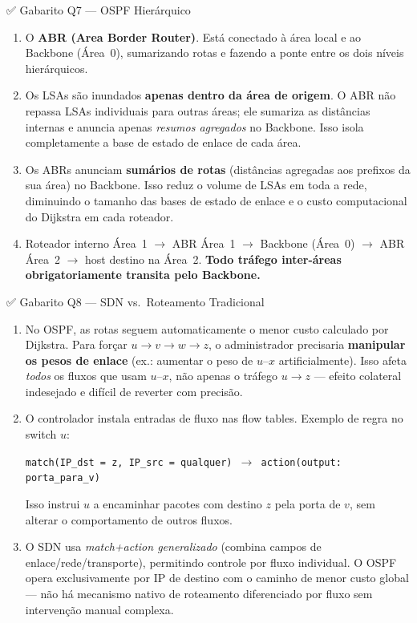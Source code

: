 \documentclass[11pt,a4paper]{article}
\begin{document}
\begin{gabaritocaixa}{✅ Gabarito Q7 --- OSPF Hierárquico}
\begin{enumerate}[label=(\alph*)]
    \item O \textbf{ABR (Area Border Router)}. Está conectado à área local e ao Backbone (Área~0), sumarizando rotas e fazendo a ponte entre os dois níveis hierárquicos.
    \item Os LSAs são inundados \textbf{apenas dentro da área de origem}. O ABR não repassa LSAs individuais para outras áreas; ele sumariza as distâncias internas e anuncia apenas \emph{resumos agregados} no Backbone. Isso isola completamente a base de estado de enlace de cada área.
    \item Os ABRs anunciam \textbf{sumários de rotas} (distâncias agregadas aos prefixos da sua área) no Backbone. Isso reduz o volume de LSAs em toda a rede, diminuindo o tamanho das bases de estado de enlace e o custo computacional do Dijkstra em cada roteador.
    \item Roteador interno Área~1 $\to$ ABR Área~1 $\to$ Backbone (Área~0) $\to$ ABR Área~2 $\to$ host destino na Área~2. \textbf{Todo tráfego inter-áreas obrigatoriamente transita pelo Backbone.}
\end{enumerate}
\end{gabaritocaixa}

\begin{gabaritocaixa}{✅ Gabarito Q8 --- SDN vs.\ Roteamento Tradicional}
\begin{enumerate}[label=(\alph*)]
    \item No OSPF, as rotas seguem automaticamente o menor custo calculado por Dijkstra. Para forçar $u \to v \to w \to z$, o administrador precisaria \textbf{manipular os pesos de enlace} (ex.: aumentar o peso de $u$--$x$ artificialmente). Isso afeta \emph{todos} os fluxos que usam $u$--$x$, não apenas o tráfego $u \to z$ --- efeito colateral indesejado e difícil de reverter com precisão.
    \item O controlador instala entradas de fluxo nas flow tables. Exemplo de regra no switch $u$:
    \begin{center}\small
    \texttt{match(IP\_dst = z, IP\_src = qualquer) $\to$ action(output: porta\_para\_v)}
    \end{center}
    Isso instrui $u$ a encaminhar pacotes com destino $z$ pela porta de $v$, sem alterar o comportamento de outros fluxos.
    \item O SDN usa \textit{match+action generalizado} (combina campos de enlace/rede/transporte), permitindo controle por fluxo individual. O OSPF opera exclusivamente por IP de destino com o caminho de menor custo global --- não há mecanismo nativo de roteamento diferenciado por fluxo sem intervenção manual complexa.
\end{enumerate}
\end{gabaritocaixa}
\end{document}
